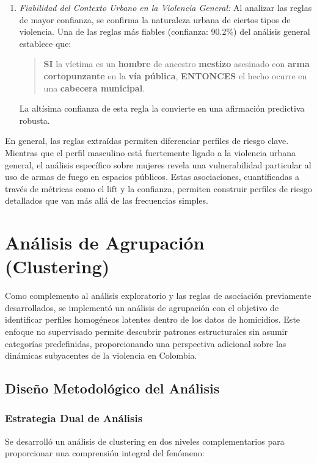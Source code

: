 \documentclass[lettersize,journal]{IEEEtran}
\begin{document}
\begin{enumerate}
    \item[4.)] \textit{Fiabilidad del Contexto Urbano en la Violencia General:} Al analizar las reglas de mayor confianza, se confirma la naturaleza urbana de ciertos tipos de violencia. Una de las reglas más fiables (confianza: 90.2\%) del análisis general establece que:
    \begin{quote}
        \textbf{SI} la víctima es un \textbf{hombre} de ancestro \textbf{mestizo} asesinado con \textbf{arma cortopunzante} en la \textbf{vía pública},
        \textbf{ENTONCES} el hecho ocurre en una \textbf{cabecera municipal}.
    \end{quote}
    La altísima confianza de esta regla la convierte en una afirmación predictiva robusta.
\end{enumerate}

En general, las reglas extraídas permiten diferenciar perfiles de riesgo clave. Mientras que el perfil masculino está fuertemente ligado a la violencia urbana general, el análisis específico sobre mujeres revela una vulnerabilidad particular al uso de armas de fuego en espacios públicos. Estas asociaciones, cuantificadas a través de métricas como el lift y la confianza, permiten construir perfiles de riesgo detallados que van más allá de las frecuencias simples.

\section{Análisis de Agrupación (Clustering)}
\label{sec:clustering}

Como complemento al análisis exploratorio y las reglas de asociación previamente desarrollados, se implementó un análisis de agrupación con el objetivo de identificar perfiles homogéneos latentes dentro de los datos de homicidios. Este enfoque no supervisado permite descubrir patrones estructurales sin asumir categorías predefinidas, proporcionando una perspectiva adicional sobre las dinámicas subyacentes de la violencia en Colombia.

\subsection{Diseño Metodológico del Análisis}

\subsubsection{Estrategia Dual de Análisis}
Se desarrolló un análisis de clustering en dos niveles complementarios para proporcionar una comprensión integral del fenómeno:
\end{document}
